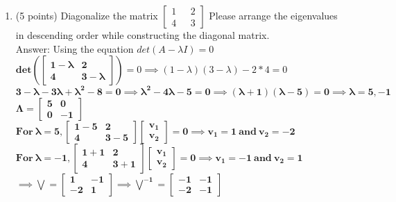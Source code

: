 \documentclass{article}%
\begin{document}
\begin{enumerate}
    \setcounter{enumi}{0}
    \item (5 points) Diagonalize the matrix 
    $\begin{bmatrix}
        1 \ \ \ & 2\\
        4 \ \ \ & 3
    \end{bmatrix}$
    Please arrange the eigenvalues in descending order while constructing the diagonal matrix. \\

    Answer: Using the equation $det (A - \lambda I) = 0$ \\
    $\mathbf{ det(\begin{bmatrix}
        1 - \lambda & 2 \\
        4 & 3 - \lambda
    \end{bmatrix}) } = 0 \implies (1 - \lambda)(3 - \lambda) - 2 * 4 = 0$ \\
    $\mathbf{ 3 - \lambda - 3 \lambda + \lambda^2 - 8 = 0 \implies \lambda^2 -4 \lambda - 5 = 0 \implies (\lambda + 1)(\lambda - 5) = 0 \implies \lambda = 5, -1}$ \\
    $\mathbf{ \Lambda = \begin{bmatrix} 5 & 0 \\ 0 & -1 \end{bmatrix} }$ \\
    $\mathbf{ For \ \lambda = 5, \begin{bmatrix} 1 - 5 & 2 \\ 4 & 3 - 5 \end{bmatrix} \begin{bmatrix} v_1 \\ v_2 \end{bmatrix} = 0 \implies v_1 = 1 \ and \ v_2 = -2 }$ \\
    $\mathbf{ For \ \lambda = -1, \begin{bmatrix} 1 + 1 & 2 \\ 4 & 3 + 1 \end{bmatrix} \begin{bmatrix} v_1 \\ v_2 \end{bmatrix} = 0 \implies v_1 = -1 \ and \ v_2 = 1 }$ \\
    $\mathbf{ \implies \bigvee = \begin{bmatrix} 1 & -1 \\ -2 & 1 \end{bmatrix} \implies \bigvee^{-1} = \begin{bmatrix} -1 & -1 \\ -2 & -1 \end{bmatrix}}$ \\

\end{enumerate}
\end{document}
